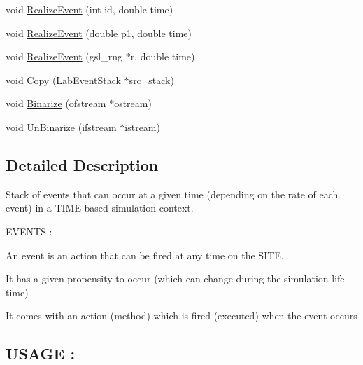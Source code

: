 \begin{DoxyCompactItemize}
\item 
void \hyperlink{classelps_1_1_lab_event_stack_a8335ecf33bf6210d5cb9c8d30a125f6e}{Realize\-Event} (int id, double time)
\item 
void \hyperlink{classelps_1_1_lab_event_stack_a1c05c3df5a26836ad67fffce8d867774}{Realize\-Event} (double p1, double time)
\item 
void \hyperlink{classelps_1_1_lab_event_stack_a20fb911dc03289f6ef3b5222073c4b61}{Realize\-Event} (gsl\-\_\-rng $\ast$r, double time)
\item 
void \hyperlink{classelps_1_1_lab_event_stack_a50e06d24fbd5a91054b5024ef13ca6f0}{Copy} (\hyperlink{classelps_1_1_lab_event_stack}{Lab\-Event\-Stack} $\ast$src\-\_\-stack)
\item 
void \hyperlink{classelps_1_1_lab_event_stack_a85bb93839b48b856a2b4d9d99804c5e0}{Binarize} (ofstream $\ast$ostream)
\item 
void \hyperlink{classelps_1_1_lab_event_stack_a2d3587e25801f8e1f1950bc933846ab0}{Un\-Binarize} (ifstream $\ast$istream)
\end{DoxyCompactItemize}


\subsection{Detailed Description}
Stack of events that can occur at a given time (depending on the rate of each event) in a T\-I\-M\-E based simulation context.\par


E\-V\-E\-N\-T\-S \-:\par
 An event is an action that can be fired at any time on the S\-I\-T\-E.
\begin{DoxyItemize}
\item It has a given propensity to occur (which can change during the simulation life time)
\item It comes with an action (method) which is fired (executed) when the event occurs
\end{DoxyItemize}

\subsection*{U\-S\-A\-G\-E \-:}


